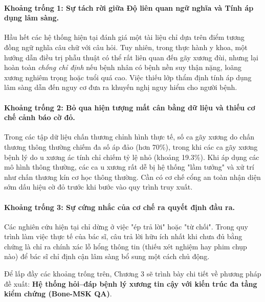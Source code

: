 \paragraph{Khoảng trống 1: Sự tách rời giữa Độ liên quan ngữ nghĩa và Tính áp dụng lâm sàng.}
Hầu hết các hệ thống hiện tại đánh giá một tài liệu chỉ dựa trên điểm tương đồng ngữ nghĩa câu chữ với câu hỏi. Tuy nhiên, trong thực hành y khoa, một hướng dẫn điều trị phẫu thuật có thể rất liên quan đến gãy xương đùi, nhưng lại hoàn toàn \emph{chống chỉ định} nếu bệnh nhân có bệnh nền suy thận nặng, loãng xương nghiêm trọng hoặc tuổi quá cao. Việc thiếu lớp thẩm định tính áp dụng lâm sàng dẫn đến nguy cơ đưa ra khuyến nghị nguy hiểm cho người bệnh.

\paragraph{Khoảng trống 2: Bỏ qua hiện tượng mất cân bằng dữ liệu và thiếu cơ chế cảnh báo cờ đỏ.}
Trong các tập dữ liệu chấn thương chỉnh hình thực tế, số ca gãy xương do chấn thương thông thường chiếm đa số áp đảo (hơn 70\%), trong khi các ca gãy xương bệnh lý do u xương ác tính chỉ chiếm tỷ lệ nhỏ (khoảng 19.3\%). Khi áp dụng các mô hình thông thường, các ca u xương rất dễ bị hệ thống "lầm tưởng" và xử trí như chấn thương kín cơ học thông thường. Cần có cơ chế cổng an toàn nhận diện sớm dấu hiệu cờ đỏ trước khi bước vào quy trình truy xuất.

\paragraph{Khoảng trống 3: Sự cứng nhắc của cơ chế ra quyết định đầu ra.}
Các nghiên cứu hiện tại chỉ dừng ở việc "ép trả lời" hoặc "từ chối". Trong quy trình làm việc thực tế của bác sĩ, câu trả lời hữu ích nhất khi chưa đủ bằng chứng là chỉ ra chính xác lỗ hổng thông tin (thiếu xét nghiệm hay phim chụp nào) để bác sĩ chỉ định cận lâm sàng bổ sung một cách chủ động.

\vspace{1em}
Để lấp đầy các khoảng trống trên, Chương 3 sẽ trình bày chi tiết về phương pháp đề xuất: \textbf{Hệ thống hỏi--đáp bệnh lý xương tin cậy với kiến trúc đa tầng kiểm chứng (Bone-MSK QA)}.